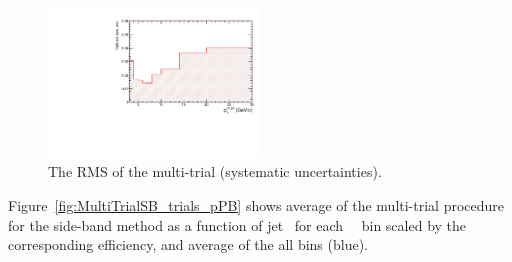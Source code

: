\begin{figure}[bth]
\begin{center}
\includegraphics[width=0.5\textwidth]{pPbplots/yieldExtraction/YieldExtSysUnc_SB}
\caption{The RMS of the multi-trial (systematic uncertainties).} 
\label{fig:MultiTrialRMS_pPB}
\end{center}
\end{figure}

Figure~\ref{fig:MultiTrialSB_trials_pPB} shows average of the multi-trial procedure for the side-band method as a function of jet \pt\ for each \Dstar\ \pt\ bin scaled by the corresponding efficiency, and average of the all \Dstar \pt bins (blue). 

